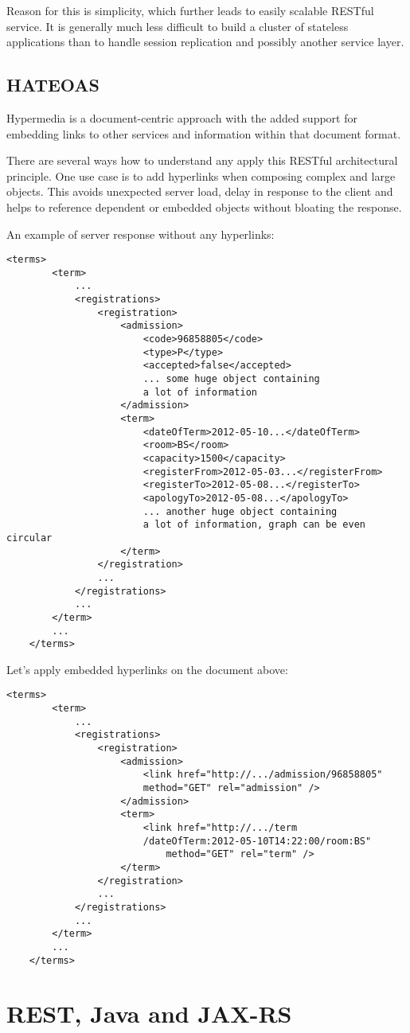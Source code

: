 	Reason for this is simplicity, which further leads to easily scalable RESTful service. It is generally much less
	difficult to build a cluster of stateless applications than to handle session replication and possibly another service
	layer.
	
	\subsection{HATEOAS}
	
	\cite[p.~11]{restful} Hypermedia is a document-centric approach with the added support for embedding links to other
	services and information within that document format.
	
	There are several ways how to understand any apply this RESTful architectural principle. One use case is to add
	hyperlinks when composing complex and large objects. This avoids unexpected server load, delay in response to the
	client and helps to reference dependent or embedded objects without bloating the response.
	
	An example of server response without any hyperlinks:
	
	\begin{lstlisting}[tabsize=2]
	<terms>
		<term>
			...
			<registrations>
				<registration>
					<admission>
						<code>96858805</code>
						<type>P</type>
						<accepted>false</accepted>
						... some huge object containing 
						a lot of information
					</admission>
					<term>
						<dateOfTerm>2012-05-10...</dateOfTerm>
						<room>BS</room>
						<capacity>1500</capacity>
						<registerFrom>2012-05-03...</registerFrom>
						<registerTo>2012-05-08...</registerTo>
						<apologyTo>2012-05-08...</apologyTo>
						... another huge object containing 
						a lot of information, graph can be even circular
					</term>
				</registration>
				...
			</registrations>
			...
		</term>
		...
	</terms>
	\end{lstlisting}
	
	Let's apply embedded hyperlinks on the document above:
	
	\begin{lstlisting}[tabsize=2]
	<terms>
		<term>
			...
			<registrations>
				<registration>
					<admission>
						<link href="http://.../admission/96858805" 
						method="GET" rel="admission" />
					</admission>
					<term>
						<link href="http://.../term
						/dateOfTerm:2012-05-10T14:22:00/room:BS"
							method="GET" rel="term" />
					</term>
				</registration>
				...
			</registrations>
			...
		</term>
		...
	</terms>
	\end{lstlisting}
	
	
	
	\section{REST, Java and JAX-RS}

